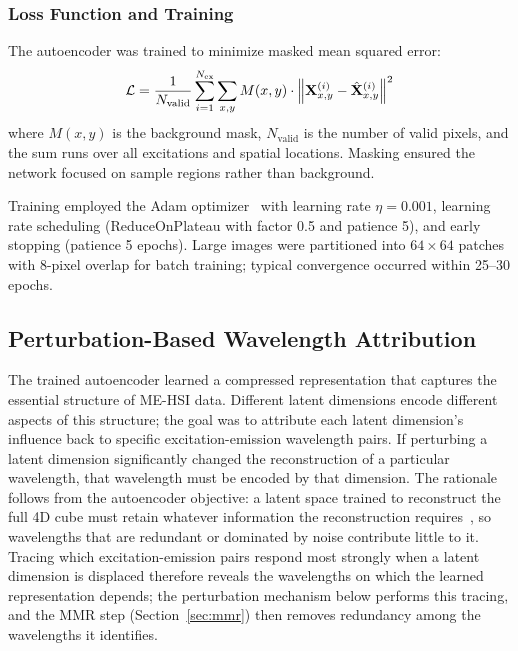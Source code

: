 \subsubsection{Loss Function and Training}
The autoencoder was trained to minimize masked mean squared error:
\begin{equation}
\mathcal{L} = \frac{1}{N_{\text{valid}}} \sum_{i=1}^{N_{\text{ex}}} \sum_{x,y} M(x,y) \cdot \left\| \mathbf{X}^{(i)}_{x,y} - \hat{\mathbf{X}}^{(i)}_{x,y} \right\|^2
\label{eq:loss}
\end{equation}
where $M(x,y)$ is the background mask, $N_{\text{valid}}$ is the number of valid pixels, and the sum runs over all excitations and spatial locations.
Masking ensured the network focused on sample regions rather than background.

Training employed the Adam optimizer~\cite{kingma2014adam} with learning rate $\eta = 0.001$, learning rate scheduling (ReduceOnPlateau with factor 0.5 and patience 5), and early stopping (patience 5 epochs).
Large images were partitioned into $64 \times 64$ patches with 8-pixel overlap for batch training; typical convergence occurred within 25--30 epochs.

\subsection{Perturbation-Based Wavelength Attribution}
\label{sec:perturbation}

The trained autoencoder learned a compressed representation that captures the essential structure of ME-HSI data.
Different latent dimensions encode different aspects of this structure; the goal was to attribute each latent dimension's influence back to specific excitation-emission wavelength pairs.
If perturbing a latent dimension significantly changed the reconstruction of a particular wavelength, that wavelength must be encoded by that dimension.
The rationale follows from the autoencoder objective: a latent space trained to reconstruct the full 4D cube must retain whatever information the reconstruction requires~\cite{hinton2006reducing}, so wavelengths that are redundant or dominated by noise contribute little to it.
Tracing which excitation-emission pairs respond most strongly when a latent dimension is displaced therefore reveals the wavelengths on which the learned representation depends; the perturbation mechanism below performs this tracing, and the MMR step (Section~\ref{sec:mmr}) then removes redundancy among the wavelengths it identifies.

